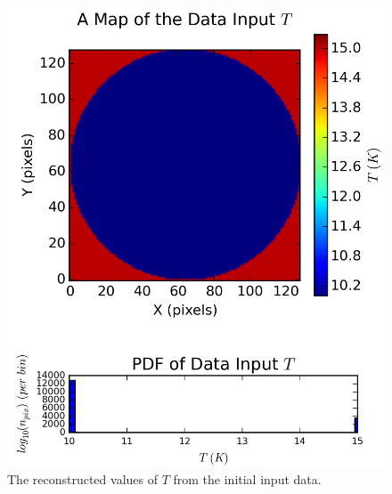 \documentclass{report}
\begin{document}
\begin{figure}[H]
{\begin{minipage}[b]{0.34\linewidth}
    \includegraphics[width=\linewidth]{../img/sim/map_T_data.png}
    \caption{\protect The reconstructed values of $T$ from the initial input data.}\label{fig:map_T_data}
    \vspace{1.5ex}
  \end{minipage}}
\end{figure}
\end{document}
